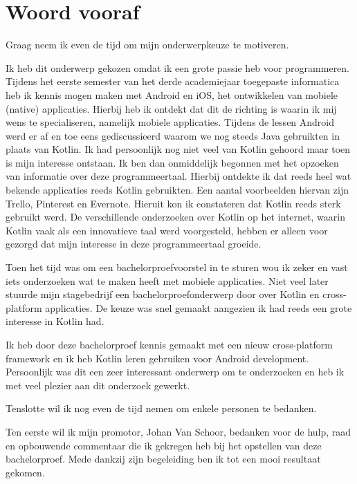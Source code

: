 
\chapter*{Woord vooraf}
\label{ch:voorwoord}

Graag neem ik even de tijd om mijn onderwerpkeuze te motiveren.

Ik heb dit onderwerp gekozen omdat ik een grote passie heb voor programmeren. Tijdens het eerste semester van het derde academiejaar toegepaste informatica heb ik kennis mogen maken met Android en iOS, het ontwikkelen van mobiele (native) applicaties. Hierbij heb ik ontdekt dat dit de richting is waarin ik mij wens te specialiseren, namelijk mobiele applicaties. Tijdens de lessen Android werd er af en toe eens gediscussieerd waarom we nog steeds Java gebruikten in plaats van Kotlin. Ik had persoonlijk nog niet veel van Kotlin gehoord maar toen is mijn interesse ontstaan. Ik ben dan onmiddelijk begonnen met het opzoeken van informatie over deze programmeertaal. Hierbij ontdekte ik dat reeds heel wat bekende applicaties reeds Kotlin gebruikten. Een aantal voorbeelden hiervan zijn Trello, Pinterest en Evernote. Hieruit kon ik constateren dat Kotlin reeds sterk gebruikt werd. De verschillende onderzoeken over Kotlin op het internet, waarin Kotlin vaak als een innovatieve taal werd voorgesteld, hebben er alleen voor gezorgd dat mijn interesse in deze programmeertaal groeide.

Toen het tijd was om een bachelorproefvoorstel in te sturen wou ik zeker en vast iets onderzoeken wat te maken heeft met mobiele applicaties. Niet veel later stuurde mijn stagebedrijf een bachelorproefonderwerp door over Kotlin en cross-platform applicaties. De keuze was snel gemaakt aangezien ik had reeds een grote interesse in Kotlin had. 

Ik heb door deze bachelorproef kennis gemaakt met een nieuw cross-platform framework en ik heb Kotlin leren gebruiken voor Android development. Persoonlijk was dit een zeer interessant onderwerp om te onderzoeken en heb ik met veel plezier aan dit onderzoek gewerkt.

Tenslotte wil ik nog even de tijd nemen om enkele personen te bedanken.

Ten eerste wil ik mijn promotor, Johan Van Schoor, bedanken voor de hulp, raad en opbouwende commentaar die ik gekregen heb bij het opstellen van deze bachelorproef. Mede dankzij zijn begeleiding ben ik tot een mooi resultaat gekomen.

